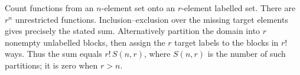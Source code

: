 Count functions from an $n$-element set onto an $r$-element labelled set. There are $r^n$ unrestricted functions. Inclusion--exclusion over the missing target elements gives precisely the stated sum. Alternatively partition the domain into $r$ nonempty unlabelled blocks, then assign the $r$ target labels to the blocks in $r!$ ways. Thus the sum equals $\boxed{r!\,S(n,r)}$, where $S(n,r)$ is the number of such partitions; it is zero when $r>n$.
